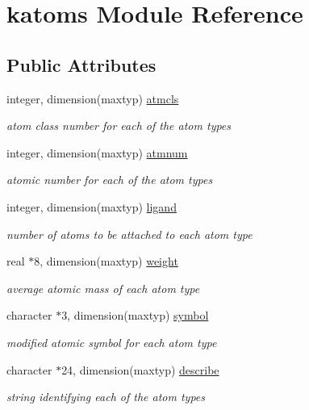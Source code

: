 \hypertarget{classkatoms}{\section{katoms Module Reference}
\label{classkatoms}
}
\subsection*{Public Attributes}
\begin{DoxyCompactItemize}
\item 
integer, dimension(maxtyp) \hyperlink{classkatoms_ac799e5c45595f48ed4b94d541937a348}{atmcls}
\begin{DoxyCompactList}\small\item\em atom class number for each of the atom types \end{DoxyCompactList}\item 
integer, dimension(maxtyp) \hyperlink{classkatoms_a80cad356bd6a49794bf7cfe073c90741}{atmnum}
\begin{DoxyCompactList}\small\item\em atomic number for each of the atom types \end{DoxyCompactList}\item 
integer, dimension(maxtyp) \hyperlink{classkatoms_ac1a3e0efb04c0c1ae4ff6a6e55becfb8}{ligand}
\begin{DoxyCompactList}\small\item\em number of atoms to be attached to each atom type \end{DoxyCompactList}\item 
real $\ast$8, dimension(maxtyp) \hyperlink{classkatoms_aca65b59a33d15ee8d54d0fa19e728184}{weight}
\begin{DoxyCompactList}\small\item\em average atomic mass of each atom type \end{DoxyCompactList}\item 
character $\ast$3, dimension(maxtyp) \hyperlink{classkatoms_a8ad577dbab24116cac34487a69082930}{symbol}
\begin{DoxyCompactList}\small\item\em modified atomic symbol for each atom type \end{DoxyCompactList}\item 
character $\ast$24, dimension(maxtyp) \hyperlink{classkatoms_ab664f162eba949d1e187ddfc1af189a3}{describe}
\begin{DoxyCompactList}\small\item\em string identifying each of the atom types \end{DoxyCompactList}\end{DoxyCompactItemize}


